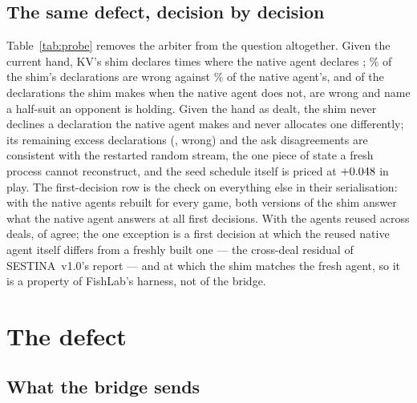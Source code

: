 \documentclass[11pt]{article}
\newcommand{\sestina}{\mbox{SESTINA v1.0}}
\newcommand{\pct}{\%}
\begin{document}
\subsection{The same defect, decision by decision}
\label{sec:probe}

\begin{table}[!ht]
\caption{The decision probe: \kcPrGames{} games, \kcPrDecisions{} on-turn decisions of native
\sestina{} in FishLab's arbiter under KV's rules, each also answered by KV's shim from the current hand
and from the hand as dealt. Hypothetical declarations are scored against the true hands.}
\label{tab:probe}
\small

\end{table}

Table~\ref{tab:probe} removes the arbiter from the question altogether. Given the current hand, KV's
shim declares \kcPrCurDecl{} times where the native agent declares \kcPrNativeDecl{}; \kcPrCurWrongPct\pct{}
of the shim's declarations are wrong against \kcPrNativeWrongPct\pct{} of the native agent's, and of the
\kcPrCurOnly{} declarations the shim makes when the native agent does not, \kcPrCurOnlyWrong{} are
wrong and \kcPrCurOnlyOwn{} name a half-suit an opponent is holding. Given the hand as dealt, the shim
never declines a declaration the native agent makes and never allocates one differently; its
remaining excess declarations (\kcPrDealtOnly{}, \kcPrDealtOnlyWrong{} wrong) and the ask
disagreements are consistent with the restarted random stream, the one piece of state a fresh process
cannot reconstruct, and the seed schedule itself is priced at $+0.048$ in play. The
first-decision row is the check on everything else in their serialisation: with the native agents
rebuilt for every game, both versions of the shim answer what the native agent answers at all
\kcPrFreshFirst{} first decisions. With the agents reused across deals, \kcPrFirstDealt{} of
\kcPrFirst{} agree; the one exception is a first decision at which the reused native agent itself
differs from a freshly built one --- the cross-deal residual of \sestina{}'s report --- and at which
the shim matches the fresh agent, so it is a property of FishLab's harness, not of the bridge.

\section{The defect}
\label{sec:defect}

\subsection{What the bridge sends}
\end{document}
